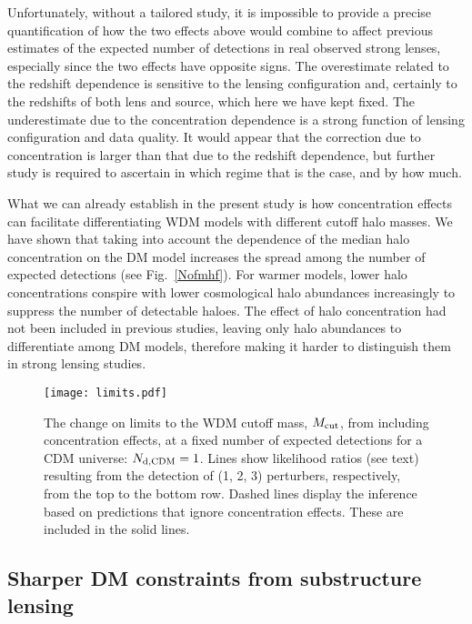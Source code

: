 \documentclass[a4paper, fleqn, usenatbib, useAMS]{mnras}
\begin{document}
Unfortunately, without a tailored study, it is impossible to provide a precise quantification 
of how the two effects above would combine to affect previous estimates of the expected number 
of detections in real observed strong lenses, especially since the two effects 
have opposite signs. The overestimate related to the redshift dependence is 
sensitive to the lensing configuration and, certainly to the redshifts of 
both lens and source, which here we have kept fixed. 
The underestimate due to the concentration dependence is 
a strong function of lensing configuration and data quality. It would appear that
the correction due to concentration is larger than that due to the redshift dependence, 
but further study is required to ascertain in which regime that is the case, and by 
how much.

What we can already establish in the present study is how
concentration effects can facilitate differentiating WDM models
with different cutoff halo masses. We have shown that taking into
account the dependence of the median halo concentration on the DM
model increases the spread among the number of expected detections
(see Fig.~\ref{Nofmhf}). For warmer models, lower halo concentrations
conspire with lower cosmological halo abundances increasingly to
suppress the number of detectable haloes. The effect of halo
concentration had not been included in previous studies, leaving only halo
abundances to differentiate among DM models, therefore
making it harder to distinguish them in strong lensing studies.

\begin{figure}
\centering
\texttt{[image: limits.pdf]}
\caption{The change on limits to the WDM cutoff mass, $M_{\rm cut}$,
  from including concentration effects, at a fixed number of expected detections for a CDM universe: $N_{\rm d, CDM}=1$.
Lines show likelihood ratios (see text) 
resulting from the detection of (1, 2, 3) perturbers, respectively,
from the top to the bottom
row. Dashed lines display the inference based on predictions that ignore concentration effects. These are included in the solid lines. }
\label{limits}
\end{figure}

\subsection{Sharper DM constraints from substructure lensing}
\label{final}
\end{document}
